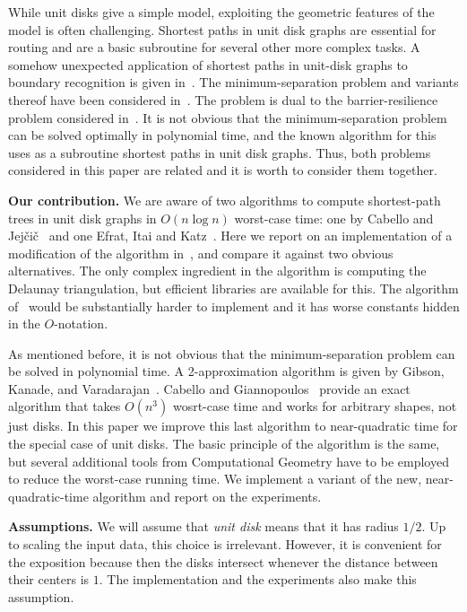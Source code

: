 \documentclass[a4paper,USenglish,numberwithinsect]{lipics}
\def\myparagraph#1{\medskip\noindent\textbf{#1.}}
\begin{document}
While unit disks give a simple model, exploiting the geometric features 
of the model is often challenging. 
Shortest paths in unit disk graphs are essential for routing and
are a basic subroutine for several other more complex tasks. 
A somehow unexpected application of shortest paths in unit-disk graphs
to boundary recognition is given in~\cite{WGM06}.
The minimum-separation problem and variants thereof have been considered 
in~\cite{CG16,gkv-ipud-11,pv-2013}. 
The problem is dual to the barrier-resilience problem considered in~\cite{BK09,KH07,KLA05,KLA07}.
It is not obvious that the minimum-separation problem can be solved optimally
in polynomial time, and the known algorithm for this uses as a subroutine 
shortest paths in unit disk graphs. 
Thus, both problems considered in this paper are related and it is worth to 
consider them together.


\myparagraph{Our contribution}
We are aware of two algorithms to compute shortest-path trees in unit disk graphs in
$O(n\log n)$ worst-case time: one by Cabello and Jej\v{c}i\v{c}~\cite{CJ15} and one Efrat, Itai and Katz~\cite{eik-01}. 
Here we report on an implementation of a modification of the algorithm in~\cite{CJ15},
and compare it against two obvious alternatives.
The only complex ingredient in the algorithm is computing the Delaunay triangulation,
but efficient libraries are available for this.
The algorithm of~\cite{eik-01} would be substantially harder to implement 
and it has worse constants hidden in the $O$-notation. 

As mentioned before, it is not obvious that the minimum-separation problem 
can be solved in polynomial time. 
A 2-approximation algorithm is given by Gibson, Kanade, and Varadarajan~\cite{gkv-ipud-11}. 
Cabello and Giannopoulos~\cite{CG16} provide an exact algorithm that takes $O(n^3)$ 
wosrt-case time and works for arbitrary shapes, not just disks. 
In this paper we improve this last algorithm to near-quadratic time for the 
special case of unit disks. 
The basic principle of the algorithm is the same, but several additional tools
from Computational Geometry have to be employed to reduce the worst-case running time. 
We implement a variant of the new, near-quadratic-time algorithm and report
on the experiments.


\myparagraph{Assumptions} 
We will assume that \emph{unit disk} means that it has radius $1/2$. 
Up to scaling the input data, this choice is irrelevant.
However, it is convenient for the exposition
because then the disks intersect whenever 
the distance between their centers is $1$. 
The implementation and the experiments also make this assumption.
\end{document}
